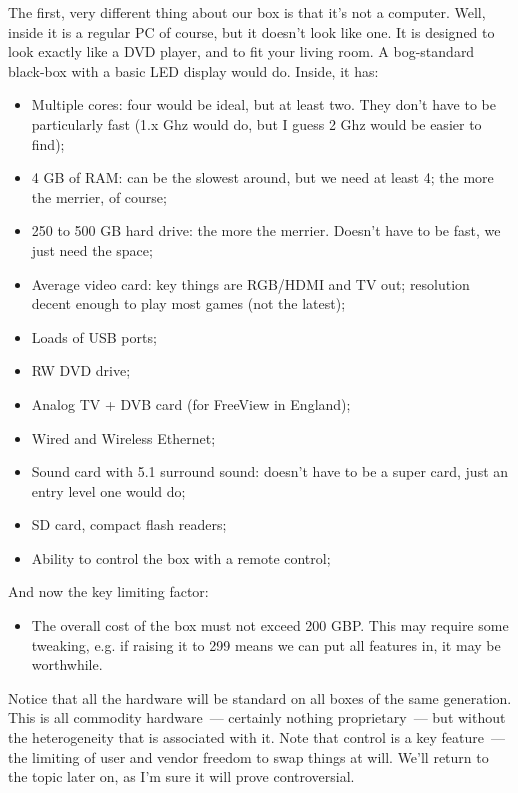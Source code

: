 \documentclass{book}
\begin{document}
The first, very different thing about our box is that it's not a
computer. Well, inside it is a regular PC of course, but it doesn't
look like one. It is designed to look exactly like a DVD player, and
to fit your living room. A bog-standard black-box with a basic LED
display would do. Inside, it has:

\begin{itemize}
\item Multiple cores: four would be ideal, but at least two. They
  don't have to be particularly fast (1.x Ghz would do, but I guess 2
  Ghz would be easier to find);
\item 4 GB of RAM: can be the slowest around, but we need at least 4;
  the more the merrier, of course;
\item 250 to 500 GB hard drive: the more the merrier. Doesn't have to
  be fast, we just need the space;
\item Average video card: key things are RGB/HDMI and TV out;
  resolution decent enough to play most games (not the latest);
\item Loads of USB ports;
\item RW DVD drive;
\item Analog TV + DVB card (for FreeView in England);
\item Wired and Wireless Ethernet;
\item Sound card with 5.1 surround sound: doesn't have to be a super
  card, just an entry level one would do;
\item SD card, compact flash readers;
\item Ability to control the box with a remote control;
\end{itemize}

And now the key limiting factor:

\begin{itemize}
\item The overall cost of the box must not exceed 200 GBP. This may
  require some tweaking, e.g. if raising it to 299 means we can put
  all features in, it may be worthwhile.
\end{itemize}

Notice that all the hardware will be standard on all boxes of the same
generation. This is all commodity hardware~--- certainly nothing
proprietary~--- but without the heterogeneity that is associated with
it. Note that control is a key feature~--- the limiting of user and
vendor freedom to swap things at will. We'll return to the topic later
on, as I'm sure it will prove controversial.
\end{document}
